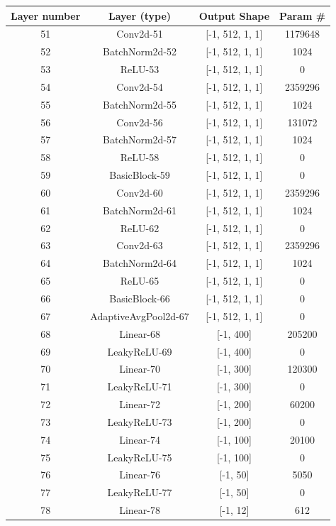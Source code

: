 \documentclass[UTF-8]{article}
\begin{document}
\begin{center}
	\begin{tabular}{|c|c|c|c|}
		\hline
		Layer number &         Layer (type)   &     Output Shape   &   Param \# \\
		\hline
		\hline
		51 &            Conv2d-51   &  [-1, 512, 1, 1]   & 1179648 \\
		\hline
		52 &       BatchNorm2d-52   &  [-1, 512, 1, 1]   & 1024 \\
		\hline
		53 &              ReLU-53   &  [-1, 512, 1, 1]   & 0 \\
		\hline
		54 &            Conv2d-54   &  [-1, 512, 1, 1]   & 2359296 \\
		\hline
		55 &       BatchNorm2d-55   &  [-1, 512, 1, 1]   & 1024 \\
		\hline
		56 &            Conv2d-56   &  [-1, 512, 1, 1]   & 131072 \\
		\hline
		57 &       BatchNorm2d-57   &  [-1, 512, 1, 1]   & 1024 \\
		\hline
		58 &              ReLU-58   &  [-1, 512, 1, 1]   & 0 \\
		\hline
		59 &        BasicBlock-59   &  [-1, 512, 1, 1]   & 0 \\
		\hline
		60 &            Conv2d-60   &  [-1, 512, 1, 1]   & 2359296 \\
		\hline
		61 &       BatchNorm2d-61   &  [-1, 512, 1, 1]   & 1024 \\
		\hline
		62 &              ReLU-62   &  [-1, 512, 1, 1]   & 0 \\
		\hline
		63 &            Conv2d-63   &  [-1, 512, 1, 1]   & 2359296 \\
		\hline
		64 &       BatchNorm2d-64   &  [-1, 512, 1, 1]   & 1024 \\
		\hline
		65 &              ReLU-65   &  [-1, 512, 1, 1]   & 0 \\
		\hline
		66 &        BasicBlock-66   &  [-1, 512, 1, 1]   & 0 \\
		\hline
		67 & AdaptiveAvgPool2d-67   &  [-1, 512, 1, 1]   & 0 \\
		\hline
		68 &            Linear-68   &        [-1, 400]   & 205200 \\
		\hline
		69 &         LeakyReLU-69   &        [-1, 400]   & 0 \\
		\hline
		70 &            Linear-70   &        [-1, 300]   & 120300 \\
		\hline
		71 &         LeakyReLU-71   &        [-1, 300]   & 0 \\
		\hline
		72 &            Linear-72   &        [-1, 200]   & 60200 \\
		\hline
		73 &         LeakyReLU-73   &        [-1, 200]   & 0 \\
		\hline
		74 &            Linear-74   &        [-1, 100]   & 20100 \\
		\hline
		75 &         LeakyReLU-75   &        [-1, 100]   & 0 \\
		\hline
		76 &            Linear-76   &         [-1, 50]   & 5050 \\
		\hline
		77 &         LeakyReLU-77   &         [-1, 50]   & 0 \\
		\hline
		78 &            Linear-78   &         [-1, 12]   & 612 \\
		\hline
	\end{tabular}
\end{center}
\end{document}
